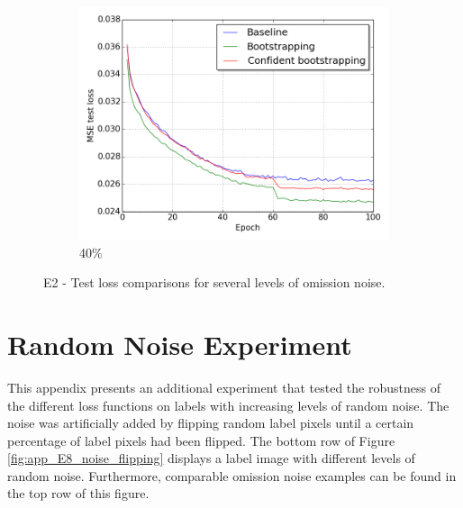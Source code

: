 \begin{figure}[H]
\begin{subfigure}{0.31\textwidth}
\end{subfigure}
\hspace*{\fill} %
\begin{subfigure}{0.31\textwidth}
\includegraphics[width=\textwidth]{figs/E2/lc_4.png}
\caption{40\%} \label{fig:app_E2_4_lc}
\vspace{-0.1cm} %
\end{subfigure}
\vspace{-0.6\baselineskip}
\caption[E2 - Test loss comparisons for several levels of omission noise]{E2 - Test loss comparisons for several levels of omission noise.} \label{fig:E2_all_lc}
\end{figure}


\section{Random Noise Experiment}
\label{app:randomnoiseexperiment}
This appendix presents an additional experiment that tested the robustness of the different loss functions on labels with increasing levels of random noise. The noise was artificially added by flipping random label pixels until a certain percentage of label pixels had been flipped. The bottom row of Figure \ref{fig:app_E8_noise_flipping} displays a label image with different levels of random noise. Furthermore, comparable omission noise examples can be found in the top row of this figure.\\


